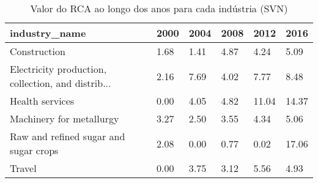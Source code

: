 \begin{table}
\centering
\caption{Valor do RCA ao longo dos anos para cada indústria (SVN)}
\begin{tabular}{p{6cm}p{1.5cm}p{1.5cm}p{1.5cm}p{1.5cm}p{1.5cm}}
\toprule
                                     industry\_name & 2000 & 2004 & 2008 &  2012 &  2016 \\
\midrule
                                      Construction & 1.68 & 1.41 & 4.87 &  4.24 &  5.09 \\
Electricity production, collection, and distrib... & 2.16 & 7.69 & 4.02 &  7.77 &  8.48 \\
                                   Health services & 0.00 & 4.05 & 4.82 & 11.04 & 14.37 \\
                          Machinery for metallurgy & 3.27 & 2.50 & 3.55 &  4.34 &  5.06 \\
             Raw and refined sugar and sugar crops & 2.08 & 0.00 & 0.77 &  0.02 & 17.06 \\
                                            Travel & 0.00 & 3.75 & 3.12 &  5.56 &  4.93 \\
\bottomrule
\end{tabular}
\end{table}
